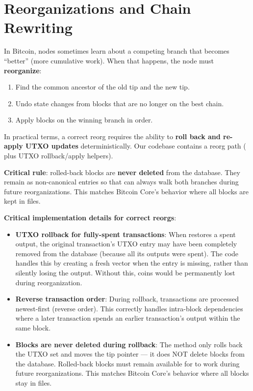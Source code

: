 \section{Reorganizations and Chain Rewriting}
\label{sec:ch09-7-reorganizations}

In Bitcoin, nodes sometimes learn about a competing branch that becomes ``better'' (more cumulative work). When that happens, the node must \textbf{reorganize}:

\begin{enumerate}
  \item Find the common ancestor of the old tip and the new tip.
  \item Undo state changes from blocks that are no longer on the best chain.
  \item Apply blocks on the winning branch in order.
\end{enumerate}

In practical terms, a correct reorg requires the ability to \textbf{roll back and re-apply UTXO updates} deterministically. Our codebase contains a reorg path ( plus UTXO rollback/apply helpers).

\textbf{Critical rule}: rolled-back blocks are \textbf{never deleted} from the database. They remain as non-canonical entries so that  can always walk both branches during future reorganizations. This matches Bitcoin Core's behavior where all blocks are kept in  files.

\textbf{Critical implementation details for correct reorgs}:

\begin{itemize}
  \item \textbf{UTXO rollback for fully-spent transactions}: When  restores a spent output, the original transaction's UTXO entry may have been completely removed from the database (because all its outputs were spent). The code handles this by creating a fresh vector when the entry is missing, rather than silently losing the output. Without this, coins would be permanently lost during reorganization.

  \item \textbf{Reverse transaction order}: During rollback, transactions are processed newest-first (reverse order). This correctly handles intra-block dependencies where a later transaction spends an earlier transaction's output within the same block.

  \item \textbf{Blocks are never deleted during rollback}: The  method only rolls back the UTXO set and moves the tip pointer --- it does NOT delete blocks from the database. Rolled-back blocks must remain available for  to work during future reorganizations. This matches Bitcoin Core's behavior where all blocks stay in  files.
\end{itemize}

